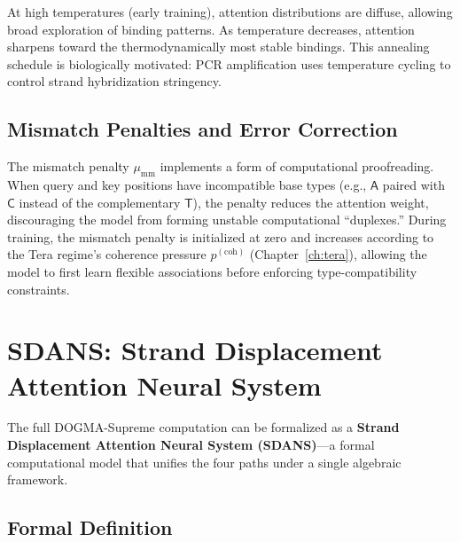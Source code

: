 At high temperatures (early training), attention distributions are diffuse, allowing broad exploration of binding patterns. As temperature decreases, attention sharpens toward the thermodynamically most stable bindings. This annealing schedule is biologically motivated: PCR amplification uses temperature cycling to control strand hybridization stringency.

\subsection{Mismatch Penalties and Error Correction}

The mismatch penalty $\mu_{\mathrm{mm}}$ implements a form of computational proofreading. When query and key positions have incompatible base types (e.g., $\mathsf{A}$ paired with $\mathsf{C}$ instead of the complementary $\mathsf{T}$), the penalty reduces the attention weight, discouraging the model from forming unstable computational ``duplexes.'' During training, the mismatch penalty is initialized at zero and increases according to the Tera regime's coherence pressure $p^{(\mathrm{coh})}$ (Chapter~\ref{ch:tera}), allowing the model to first learn flexible associations before enforcing type-compatibility constraints.

\section{SDANS: Strand Displacement Attention Neural System}
\label{sec:sdans}

The full DOGMA-Supreme computation can be formalized as a \textbf{Strand Displacement Attention Neural System (SDANS)}---a formal computational model that unifies the four paths under a single algebraic framework.

\subsection{Formal Definition}

